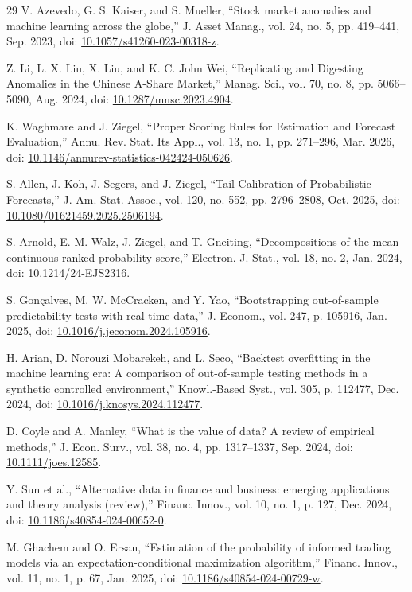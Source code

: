 \documentclass{ieeeaccess}
\begin{document}
\begin{thebibliography}{29}
 V. Azevedo, G. S. Kaiser, and S. Mueller, ``Stock market anomalies and machine learning across the globe,'' J. Asset Manag., vol. 24, no. 5, pp. 419--441, Sep. 2023, doi: \url{10.1057/s41260-023-00318-z}.

 Z. Li, L. X. Liu, X. Liu, and K. C. John Wei, ``Replicating and Digesting Anomalies in the Chinese A-Share Market,'' Manag. Sci., vol. 70, no. 8, pp. 5066--5090, Aug. 2024, doi: \url{10.1287/mnsc.2023.4904}.

 K. Waghmare and J. Ziegel, ``Proper Scoring Rules for Estimation and Forecast Evaluation,'' Annu. Rev. Stat. Its Appl., vol. 13, no. 1, pp. 271--296, Mar. 2026, doi: \url{10.1146/annurev-statistics-042424-050626}.

 S. Allen, J. Koh, J. Segers, and J. Ziegel, ``Tail Calibration of Probabilistic Forecasts,'' J. Am. Stat. Assoc., vol. 120, no. 552, pp. 2796--2808, Oct. 2025, doi: \url{10.1080/01621459.2025.2506194}.

 S. Arnold, E.-M. Walz, J. Ziegel, and T. Gneiting, ``Decompositions of the mean continuous ranked probability score,'' Electron. J. Stat., vol. 18, no. 2, Jan. 2024, doi: \url{10.1214/24-EJS2316}.

 S. Gon{\c{c}}alves, M. W. McCracken, and Y. Yao, ``Bootstrapping out-of-sample predictability tests with real-time data,'' J. Econom., vol. 247, p. 105916, Jan. 2025, doi: \url{10.1016/j.jeconom.2024.105916}.

 H. Arian, D. Norouzi Mobarekeh, and L. Seco, ``Backtest overfitting in the machine learning era: A comparison of out-of-sample testing methods in a synthetic controlled environment,'' Knowl.-Based Syst., vol. 305, p. 112477, Dec. 2024, doi: \url{10.1016/j.knosys.2024.112477}.

 D. Coyle and A. Manley, ``What is the value of data? A review of empirical methods,'' J. Econ. Surv., vol. 38, no. 4, pp. 1317--1337, Sep. 2024, doi: \url{10.1111/joes.12585}.

 Y. Sun et al., ``Alternative data in finance and business: emerging applications and theory analysis (review),'' Financ. Innov., vol. 10, no. 1, p. 127, Dec. 2024, doi: \url{10.1186/s40854-024-00652-0}.

 M. Ghachem and O. Ersan, ``Estimation of the probability of informed trading models via an expectation-conditional maximization algorithm,'' Financ. Innov., vol. 11, no. 1, p. 67, Jan. 2025, doi: \url{10.1186/s40854-024-00729-w}.


\end{thebibliography}
\end{document}
